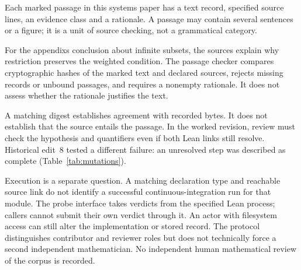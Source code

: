 \documentclass[10pt]{article}
\begin{document}
Each marked passage in this systems paper has a text record, specified source lines, an evidence class and a rationale. A passage may contain several sentences or a figure; it is a unit of source checking, not a grammatical category.

For the appendix\textquotesingle s conclusion about infinite subsets, the sources explain why restriction preserves the weighted condition. The passage checker compares cryptographic hashes of the marked text and declared sources, rejects missing records or unbound passages, and requires a nonempty rationale. It does not assess whether the rationale justifies the text.

A matching digest establishes agreement with recorded bytes. It does not establish that the source entails the passage.
In the worked revision, review must check the hypothesis and quantifiers even if both Lean links still resolve. Historical edit~8 tested a different failure: an unresolved step was described as complete (Table~\ref{tab:mutations}).

Execution is a separate question. A matching declaration type and reachable source link do not identify a successful continuous-integration run for that module.
The probe interface takes verdicts from the specified Lean process; callers cannot submit their own verdict through it.
An actor with filesystem access can still alter the implementation or stored record.
The protocol distinguishes contributor and reviewer roles but does not technically force a second independent mathematician. No independent human mathematical review of the corpus is recorded.
\end{document}
